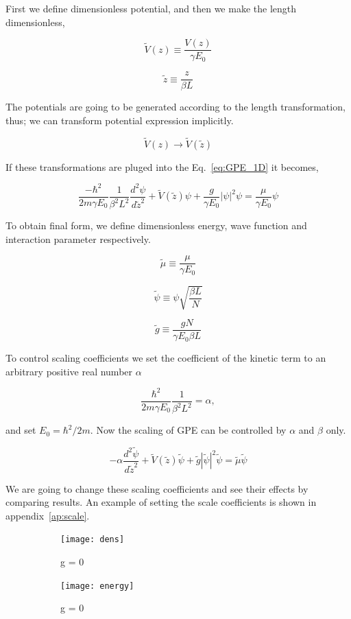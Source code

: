 \documentclass[a4paper,times,12pt]{article}
\begin{document}
First we define dimensionless potential, and then we make the length dimensionless,

$$ \widetilde{V}(z) \equiv \frac{V(z)}{\gamma E_0} $$

$$ \widetilde{z} \equiv \frac{z}{\beta L} $$

The potentials are going to be generated according to the length transformation, thus; we can transform potential expression implicitly. 

$$ \widetilde{V}(z) \rightarrow \widetilde{V}(\widetilde{z}) $$ 

If these transformations are pluged into the Eq.~\eqref{eq:GPE_1D} it becomes,

\begin{equation}
    \label{eq:GPE_1D_dimensionless_en_len}
    \frac{-\hbar^2}{2m\gamma E_0} \frac{1}{\beta^2 L^2}  \frac{d^2\psi}{d \widetilde{z}^2} + \widetilde{V}(\widetilde{z})\psi + \frac{g}{\gamma E_0}|\psi|^2\psi = \frac{\mu}{\gamma E_0}\psi
\end{equation}

To obtain final form, we define dimensionless energy, wave function and interaction parameter respectively. 

$$\widetilde{\mu} \equiv \frac{\mu}{\gamma E_0}$$

$$ \widetilde{\psi} \equiv \psi{\sqrt{\frac{\beta L}{N}}}  $$

$$\widetilde{g} \equiv \frac{gN}{\gamma E_0 \beta L} $$

To control scaling coefficients we set the coefficient of the kinetic term to an arbitrary positive real number $\alpha$  

$$ \frac{\hbar^2}{2m\gamma E_0} \frac{1}{\beta^2 L^2} = \alpha, $$

and set $E_0 = \hbar^2 / 2m$. Now the scaling of GPE can be controlled by $\alpha$ and $\beta$ only.

\begin{equation}
\label{eq:GPE_dimensionless}
    -\alpha\frac{d^2\widetilde{\psi}}{d\widetilde{z}^2} + \widetilde{V}(\widetilde{z})\widetilde{\psi} + \widetilde{g}|\widetilde{\psi}|^2 \widetilde{\psi} = \widetilde{\mu} \widetilde{\psi}
\end{equation}
    
We are going to change these scaling coefficients and see their effects by comparing results. An example of setting the scale coefficients is shown in appendix~\ref{ap:scale}.



\graphicspath{{"../figs/numericanalyze/"}}
\begin{figure}[H]
    \centering
    \begin{subfigure}[t]{0.45\textwidth}
        \texttt{[image: dens]}
        \caption{g = 0}
		\label{fig:a}
    \end{subfigure}
    \begin{subfigure}[t]{0.45\textwidth}
        \texttt{[image: energy]}
        \caption{g = 0}
		\label{fig:a}
    \end{subfigure}
    \caption{}
\label{fig:energy_dist}
\end{figure}
\end{document}
